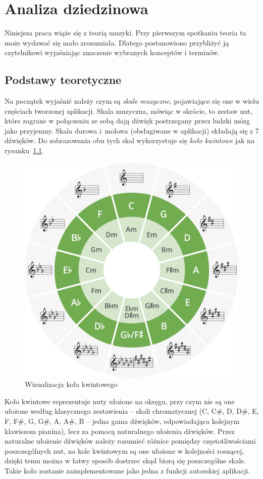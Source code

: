 \chapter{Analiza dziedzinowa}
Niniejsza praca wiąże się z teorią muzyki. Przy pierwszym spotkaniu teoria ta może wydawać się mało zrozumiała. Dlatego postanowiono przybliżyć ją czytelnikowi wyjaśniając znaczenie wybranych konceptów i terminów.
\section{Podstawy teoretyczne}
Na początek wyjaśnić należy czym są \emph{skale muzyczne}, pojawiające się one w wielu częściach tworzonej aplikacji. Skala muzyczna, mówiąc w skrócie, to zestaw nut, które zagrane w połączeniu ze sobą dają dźwięk postrzegany przez ludzki mózg jako przyjemny. Skala durowa i~molowa (obsługiwane w aplikacji) składają się z 7 dźwięków. Do zobrazowania obu tych skal wykorzystuje się \emph{koło kwintowe} jak na rysunku~\ref{fig:kolokwintylowe}. 
\begin{figure}[htb]
	\centering
	\includegraphics[width=.48\linewidth]{rys02/cof2.1}
	\caption{Wizualizacja koła kwintowego} \label{fig:kolokwintylowe}
\end{figure}

Koło kwintowe reprezentuje nuty ułożone na okręgu, przy czym nie są one ułożone według klasycznego zestawienia -- skali chromatycznej (C, C\#, D, D\#, E, F, F\#, G, G\#, A, A\#, B -- jedna gama dźwięków, odpowiadająca kolejnym klawiszom pianina), lecz za pomocą naturalnego ułożenia dźwięków. 
Przez naturalne ułożenie dźwięków należy rozumieć różnice pomiędzy częstotliwościami poszczególnych nut, na kole kwintowym są one ułożone w kolejności rosnącej, dzięki temu można w łatwy sposób dostrzec skąd biorą się poszczególne skale. Takie koło zostanie zaimplementowane jako jedna z funkcji autorskiej aplikacji.


